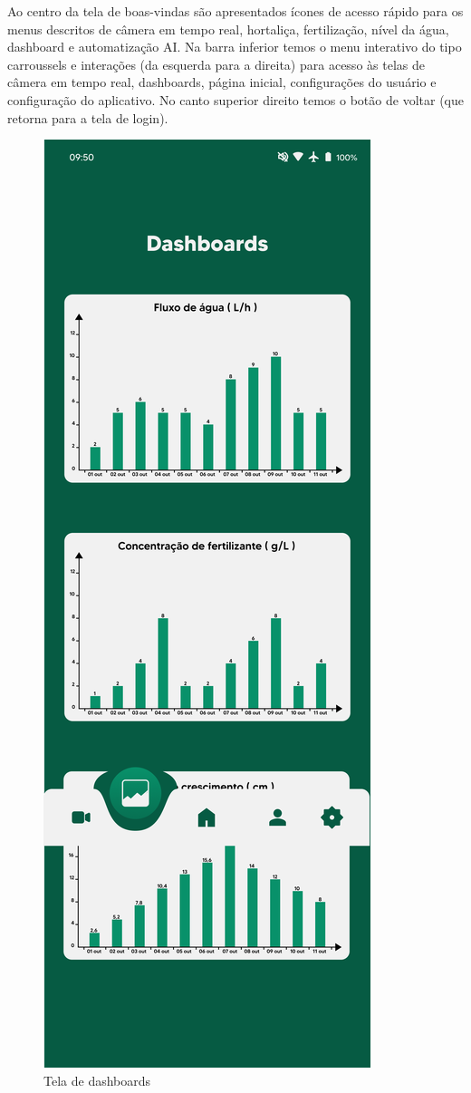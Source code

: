 Ao centro da tela de boas-vindas são apresentados ícones de acesso rápido para os menus descritos de câmera em tempo real, hortaliça, fertilização, nível da água, dashboard e automatização AI. Na barra inferior temos o menu interativo do tipo carroussels e interações (da esquerda para a direita) para acesso às telas de câmera em tempo real, dashboards, página inicial, configurações do usuário e configuração do aplicativo. No canto superior direito temos o botão de voltar (que retorna para a tela de login).

\begin{figure}[!h]
\centering
\caption{Tela de dashboards}
\label{fig:picture5}
\includegraphics[scale=0.3]{Illustrations/Picture5.png}
\end{figure}

